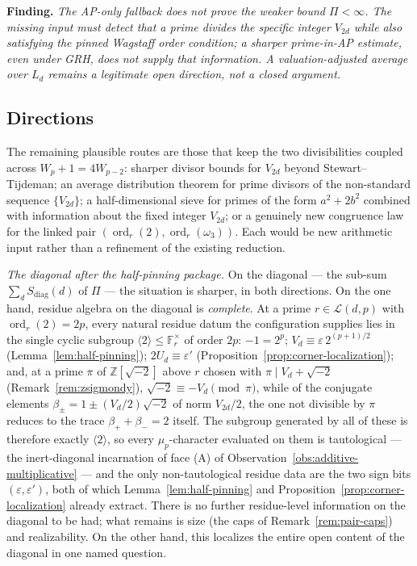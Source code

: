 \documentclass[11pt]{amsart}
\theoremstyle{plain}
\theoremstyle{definition}
\theoremstyle{remark}
\numberwithin{equation}{section}
\newcommand{\ord}{\operatorname{ord}}
\newcommand{\Z}{\mathbb{Z}}
\newcommand{\F}{\mathbb{F}}
\begin{document}
\medskip
\noindent\textbf{Finding.} \emph{The AP-only fallback does not prove the weaker bound $\Pi<\infty$. The missing input must detect that a prime divides the specific integer $V_{2d}$ while also satisfying the pinned Wagstaff order condition; a sharper prime-in-AP estimate, even under GRH, does not supply that information. A valuation-adjusted average over $L_d$ remains a legitimate open direction, not a closed argument.}
\medskip

\subsection{Directions}\label{sec:pppc-directions}

The remaining plausible routes are those that keep the two divisibilities coupled across $W_p+1=4W_{p-2}$: sharper divisor bounds for $V_{2d}$ beyond Stewart--Tijdeman; an average distribution theorem for prime divisors of the non-standard sequence $\{V_{2d}\}$; a half-dimensional sieve for primes of the form $a^2+2b^2$ combined with information about the fixed integer $V_{2d}$; or a genuinely new congruence law for the linked pair $(\ord_r(2),\ord_r(\omega_3))$. Each would be new arithmetic input rather than a refinement of the existing reduction.

\medskip
\noindent\emph{The diagonal after the half-pinning package.} On the diagonal --- the sub-sum $\sum_d S_{\mathrm{diag}}(d)$ of $\Pi$ --- the situation is sharper, in both directions. On the one hand, residue algebra on the diagonal is \emph{complete}. At a prime $r \in \mathcal{L}(d, p)$ with $\ord_r(2) = 2p$, every natural residue datum the configuration supplies lies in the single cyclic subgroup $\langle 2 \rangle \leq \F_r^\times$ of order $2 p$: $-1 = 2^p$; $V_d \equiv \varepsilon\, 2^{(p+1)/2}$ (Lemma~\ref{lem:half-pinning}); $2 U_d \equiv \varepsilon'$ (Proposition~\ref{prop:corner-localization}); and, at a prime $\pi$ of $\Z[\sqrt{-2}]$ above $r$ chosen with $\pi \mid V_d + \sqrt{-2}$ (Remark~\ref{rem:zsigmondy}), $\sqrt{-2} \equiv -V_d \pmod \pi$, while of the conjugate elements $\beta_{\pm} = 1 \pm (V_d/2)\sqrt{-2}$ of norm $V_{2d}/2$, the one not divisible by $\pi$ reduces to the trace $\beta_+ + \beta_- = 2$ itself. The subgroup generated by all of these is therefore exactly $\langle 2 \rangle$, so every $\mu_p$-character evaluated on them is tautological --- the inert-diagonal incarnation of face (A) of Observation~\ref{obs:additive-multiplicative} --- and the only non-tautological residue data are the two sign bits $(\varepsilon, \varepsilon')$, both of which Lemma~\ref{lem:half-pinning} and Proposition~\ref{prop:corner-localization} already extract. There is no further residue-level information on the diagonal to be had; what remains is size (the caps of Remark~\ref{rem:pair-caps}) and realizability. On the other hand, this localizes the entire open content of the diagonal in one named question.
\end{document}
